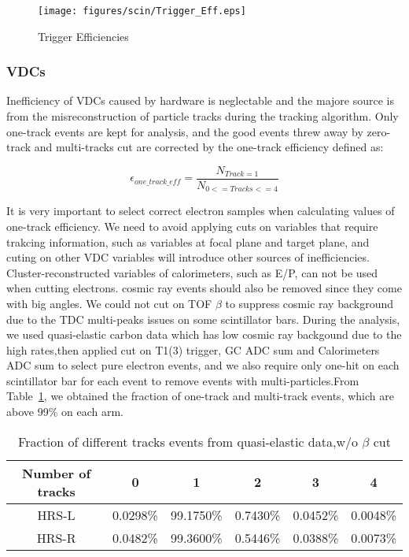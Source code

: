 \documentclass[a4paper,10.5pt]{article}
\begin{document}
\begin{figure}[h!]
\centerline{\texttt{[image: figures/scin/Trigger\_Eff.eps]}}
\caption[Trigger Efficiencies]{\footnotesize{Trigger Efficiencies}}
\label{trig_eff}
\end{figure}

\subsubsection{VDCs}

Inefficiency of VDCs caused by hardware is neglectable and the majore source is from the misreconstruction of particle tracks during the tracking algorithm. Only one-track events are kept for analysis, and the good events threw away by zero-track and multi-tracks cut are corrected by the one-track efficiency defined as:

\begin{equation}
 \epsilon_{one\_track\_eff} = \frac{N_{Track=1}}{N_{0<=Tracks<=4}}
\end{equation}

 It is very important to select correct electron samples when calculating values of one-track efficiency. We need to avoid applying cuts on variables that require trakcing information, such as variables at focal plane and target plane, and cuting on other VDC variables will introduce other sources of inefficiencies. Cluster-reconstructed variables of calorimeters, such as E/P, can not be used when cutting electrons. cosmic ray events should also be removed since they come with big angles. We could not cut on TOF $\beta$ to suppress cosmic ray background due to the TDC multi-peaks issues on some scintillator bars. During the analysis, we used quasi-elastic carbon data which has low cosmic ray backgound due to the high rates,then applied cut on T1(3) trigger, GC ADC sum and Calorimeters ADC sum to select pure electron events, and we also require only one-hit on each scintillator bar for each event to remove events with multi-particles.From Table~\ref{vdc_table}, we obtained the fraction of one-track and multi-track events, which are above 99\% on each arm.

\begin{table}[h!]
\centering
\begin{tabular}{|c||ccccc|}
	\hline
\textbf{Number of tracks}  & 0 & 1 & 2 & 3 & 4     \\
	\hline \hline
HRS-L   & 0.0298\% & 99.1750\% & 0.7430\% & 0.0452\% & 0.0048\%  \\
        \hline
HRS-R   & 0.0482\% & 99.3600\% & 0.5446\% & 0.0388\% & 0.0073\%  \\
	\hline \hline
\end{tabular}
\caption{Fraction of different tracks events from quasi-elastic data,w/o $\beta$ cut}
\label{vdc_table}	
\end{table}
\end{document}
